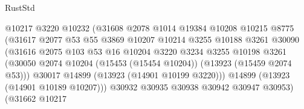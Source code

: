 \begin{lexlean}{RustStd}
\begin{coremodule}
                                        @10217
                                        @3220
                                        @10232
                                        (@31608
                                          @2078
                                          @1014
                                          @19384
                                          @10208
                                          @10215
                                          @8775
                                          (@31617
                                            @2077
                                            @53
                                            @55
                                            @3869
                                            @10207
                                            @10214
                                            @3255
                                            @10188
                                            @3261
                                            @30090
                                            (@31616
                                              @2075
                                              @103
                                              @53
                                              @16
                                              @10204
                                              @3220
                                              @3234
                                              @3255
                                              @10198
                                              @3261
                                              (@30050
                                                @2074
                                                @10204
                                                (@15453 (@15454 @10204))
                                                (@13923 (@15459 @2074 @53)))
                                              @30017
                                              @14899
                                              (@13923 (@14901 @10199 @3220)))
                                            @14899
                                            (@13923 (@14901 @10189 @10207)))
                                          @30932
                                          @30935
                                          @30938
                                          @30942
                                          @30947
                                          @30953)
                                        (@31662
                                          @10217

\end{coremodule}
\end{lexlean}
